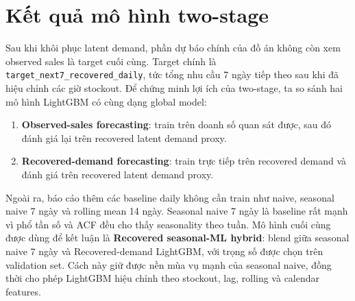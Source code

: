 \documentclass[12pt,a4paper]{article}
\begin{document}
\section{Kết quả mô hình two-stage}
Sau khi khôi phục latent demand, phần dự báo chính của đồ án không còn xem observed sales là target cuối cùng.
Target chính là \texttt{target\_next7\_recovered\_daily}, tức tổng nhu cầu 7 ngày tiếp theo sau khi đã hiệu chỉnh các giờ stockout.
Để chứng minh lợi ích của two-stage, ta so sánh hai mô hình LightGBM có cùng dạng global model:
\begin{enumerate}
    \item \textbf{Observed-sales forecasting}: train trên doanh số quan sát được, sau đó đánh giá lại trên recovered latent demand proxy.
    \item \textbf{Recovered-demand forecasting}: train trực tiếp trên recovered demand và đánh giá trên recovered latent demand proxy.
\end{enumerate}
Ngoài ra, báo cáo thêm các baseline daily không cần train như naive, seasonal naive 7 ngày và rolling mean 14 ngày.
Seasonal naive 7 ngày là baseline rất mạnh vì phổ tần số và ACF đều cho thấy seasonality theo tuần.
Mô hình cuối cùng được dùng để kết luận là \textbf{Recovered seasonal-ML hybrid}: blend giữa seasonal naive 7 ngày và Recovered-demand LightGBM, với trọng số được chọn trên validation set.
Cách này giữ được nền mùa vụ mạnh của seasonal naive, đồng thời cho phép LightGBM hiệu chỉnh theo stockout, lag, rolling và calendar features.
\end{document}
